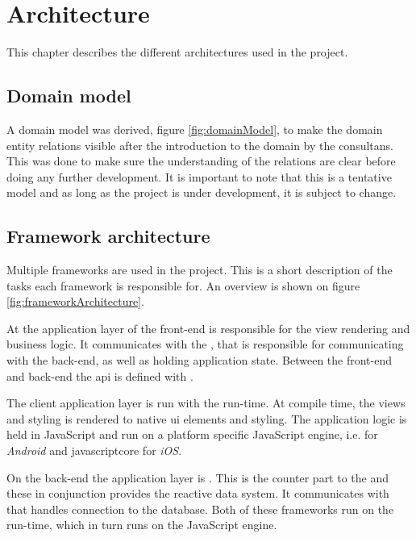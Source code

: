 \chapter{Architecture}
This chapter describes the different architectures used in the project.

\section{Domain model}
A domain model was derived, figure \ref{fig:domainModel}, to make the domain entity relations visible after the introduction to the domain by the consultans.
This was done to make sure the understanding of the relations are clear before doing any further development.
It is important to note that this is a tentative model and as long as the project is under development, it is subject to change.


\section{Framework architecture}
Multiple frameworks are used in the project.
This is a short description of the tasks each framework is responsible for.
An overview is shown on figure \ref{fig:frameworkArchitecture}.

At the application layer of the front-end  is responsible for the view rendering and business logic.
It communicates with the , that is responsible for communicating with the back-end, as well as holding application state.
Between the front-end and back-end the \gls{api} is defined with .

The client application layer is run with the  run-time.
At compile time, the  views and styling is rendered to native \gls{ui} elements and styling.
The application logic is held in JavaScript and run on a platform specific JavaScript engine, i.e.  for \textit{Android} and \gls{javascriptcore} for \textit{iOS}.

On the back-end the application layer is .
This is the counter part to the  and these in conjunction provides the reactive data system.
It communicates with  that handles connection to the database.
Both of these frameworks run on the  run-time, which in turn runs on the  JavaScript engine.

